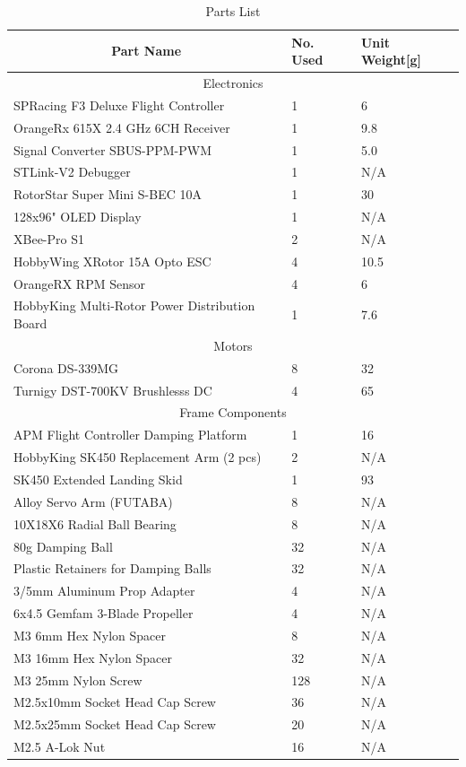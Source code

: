 \begin{table}[htbp]
\centering
\begin{tabularx}{\textwidth}{|X|l|l|}
\hline
\multicolumn{1}{|c|}{Part Name} & No. Used & Unit Weight[g]\\ \hline
\multicolumn{3}{|c|}{Electronics}\\ \hline
SPRacing F3 Deluxe Flight Controller & 1 & 6\\ \hline
OrangeRx 615X 2.4 GHz 6CH Receiver & 1 & 9.8\\ \hline
Signal Converter SBUS-PPM-PWM & 1 & 5.0\\ \hline 
STLink-V2 Debugger & 1 & N/A\\ \hline
RotorStar Super Mini S-BEC 10A & 1 & 30\\ \hline
128x96" OLED Display & 1 & N/A \\ \hline
XBee-Pro S1 & 2 & N/A \\ \hline
HobbyWing XRotor 15A Opto ESC & 4 & 10.5\\ \hline
OrangeRX RPM Sensor & 4 & 6\\ \hline
HobbyKing Multi-Rotor Power Distribution Board & 1 & 7.6\\ \hline
\multicolumn{3}{|c|}{Motors}\\ \hline
Corona DS-339MG & 8 & 32\\ \hline
Turnigy DST-700KV Brushlesss DC & 4 & 65\\ \hline
\multicolumn{3}{|c|}{Frame Components}\\ \hline
APM Flight Controller Damping Platform & 1 & 16\\ \hline
HobbyKing SK450 Replacement Arm (2 pcs) & 2 & N/A\\ \hline
SK450 Extended Landing Skid & 1 & 93\\ \hline
Alloy Servo Arm (FUTABA) & 8 & N/A\\ \hline
10X18X6 Radial Ball Bearing & 8 & N/A\\ \hline
80g Damping Ball & 32 & N/A\\ \hline
Plastic Retainers for Damping Balls & 32 & N/A\\ \hline
3/5mm Aluminum Prop Adapter & 4 & N/A\\ \hline
6x4.5 Gemfam 3-Blade Propeller & 4 & N/A\\ \hline
M3 6mm Hex Nylon Spacer & 8 & N/A\\ \hline
M3 16mm Hex Nylon Spacer & 32 & N/A\\ \hline
M3 25mm Nylon Screw & 128 & N/A\\ \hline
M2.5x10mm Socket Head Cap Screw & 36 & N/A\\ \hline
M2.5x25mm Socket Head Cap Screw & 20 & N/A\\ \hline
M2.5 A-Lok Nut & 16 & N/A\\ \hline 
\end{tabularx}
\label{tab:partslist}
\caption{Parts List}
\end{table}
